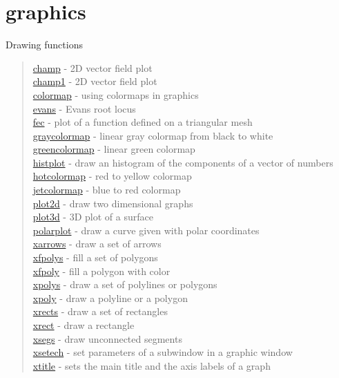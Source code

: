 \chapter*{graphics}

Drawing functions
\begin{quote}
\noindent
\hyperlink{champ}{champ} - 2D vector field plot \\
\hyperlink{champ1}{champ1} - 2D vector field plot \\
\hyperlink{colormap}{colormap} - using colormaps in graphics\\
\hyperlink{evans}{evans} - Evans root locus\\
\hyperlink{fec}{fec} -  plot of a function defined on a triangular mesh\\
\hyperlink{graycolormap}{graycolormap} - linear gray colormap from black to white\\
\hyperlink{greencolormap}{greencolormap} - linear green colormap\\
\hyperlink{histplot}{histplot} - draw an histogram of the components of a vector of numbers\\
\hyperlink{hotcolormap}{hotcolormap} - red to yellow colormap\\
\hyperlink{jetcolormap}{jetcolormap} - blue to red colormap \\
\hyperlink{plot2d}{plot2d} - draw two dimensional graphs\\
\hyperlink{plot3d}{plot3d} - 3D plot of a surface \\
\hyperlink{polarplot}{polarplot} - draw a curve given with polar coordinates \\
\hyperlink{xarrows}{xarrows} - draw a set of arrows \\ 
\hyperlink{xfpolys}{xfpolys} - fill a set of polygons \\
\hyperlink{xfpoly}{xfpoly} - fill a polygon with color \\
\hyperlink{xpolys}{xpolys} - draw a set of polylines or polygons \\
\hyperlink{xpoly}{xpoly} - draw a polyline or a polygon \\
\hyperlink{xrects}{xrects} - draw a set of rectangles\\
\hyperlink{xrect}{xrect} - draw a rectangle\\
\hyperlink{xsegs}{xsegs} - draw unconnected segments \\
\hyperlink{xsetech}{xsetech} - set parameters of a subwindow in a graphic window\\ 
\hyperlink{xtitle}{xtitle} - sets the main title and the axis labels of a graph\\
\end{quote}


